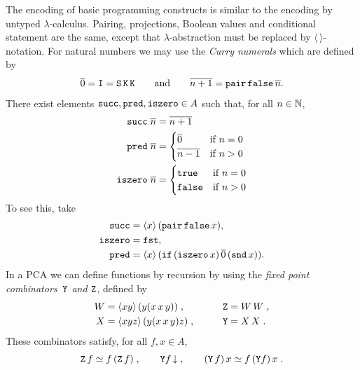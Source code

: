 The encoding of basic programming constructs is similar to the
encoding by untyped $\lambda$-calculus.
%
%
%
%
\label{sym:combPair}%
\label{sym:combFst}%
\label{sym:combSnd}%
%
Pairing, projections, Boolean values and conditional statement are the
same, except that $\lambda$-abstraction must be replaced by
$\langle\,\rangle$-notation. For natural numbers we may use the
%
%
%
\label{sym:curry_numeral}%
%
\emph{Curry numerals} which are defined by 
%
\begin{equation*}
  \overline{0} = \mathtt{I} = \mathtt{S}\, \mathtt{K}\, \mathtt{K}
  \qquad\text{and}\qquad
  \overline{n+1} = \mathtt{pair} \, \mathtt{false} \, \overline{n}.
\end{equation*}
%
There exist elements
%
%
%
%
%
$\mathtt{succ}, \mathtt{pred}, \mathtt{iszero} \in A$ such that,
for all $n \in \mathbb{N}$,
%
\label{sym:succ}%
\label{sym:pred}%
\label{sym:iszero}%
%
\begin{align*}
  \mathtt{succ}\; \overline{n} &= \overline{n+1} \\
  \mathtt{pred}\; \overline{n} &= 
  \begin{cases}
    \overline{0} & \text{if $n = 0$} \\
    \overline{n-1} & \text{if $n > 0$}
  \end{cases}\\
  \mathtt{iszero}\; \overline{n} &=
  \begin{cases}
    \mathtt{true} & \text{if $n = 0$} \\
    \mathtt{false} & \text{if $n > 0$}
  \end{cases}
\end{align*}
%
To see this, take
%
\begin{align*}
  \mathtt{succ} &= \langle x \rangle\,(\mathtt{pair} \, \mathtt{false} \,x),\\ 
  \mathtt{iszero} &= \mathtt{fst},\\
  \mathtt{pred} &=
  \langle x \rangle\,(\mathtt{if}\, (\mathtt{iszero}\, x)\, \overline{0}\, (\mathtt{snd}\, x)).
\end{align*}
%
In a PCA we can define functions by recursion by using the
%
%
%
%
%
\label{sym:combY}%
\label{sym:combZ}%
\label{sym:combW}%
%
\emph{fixed point combinators~$\mathtt{Y}$ and $\mathtt{Z}$}, defined by
%
\begin{alignat*}{2}
  W &= \langle x y \rangle\,(y(x\, x\, y))\;, &
  \qquad
  \mathtt{Z} &= W\, W \;, \\
  X &= \langle x y z \rangle\,(y (x\, x\, y) z) \;, &
  \qquad
  \mathtt{Y} &= X\, X \;.
\end{alignat*}
%
These combinators satisfy, for all $f, x \in A$,
%
\begin{equation*}
  \mathtt{Z}\, f \simeq f\, (\mathtt{Z}\, f) \;,
  \qquad
  \mathtt{Y} f\,{\downarrow} \;,
  \qquad
  (\mathtt{Y}\, f)\, x \simeq f\, (\mathtt{Y} f)\, x \;.
\end{equation*}

